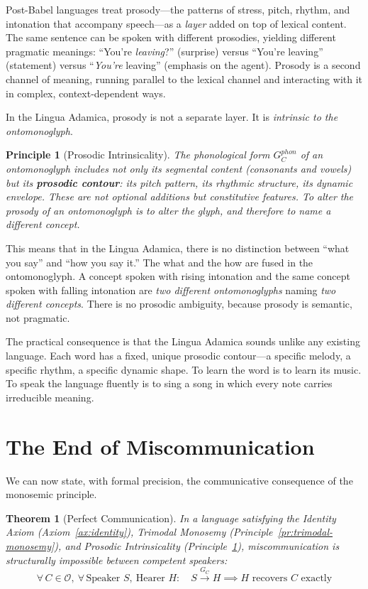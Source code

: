 \documentclass[12pt, letterpaper]{book}
\newtheorem{theorem}{Theorem}[chapter]
\newtheorem{principle}{Principle}[chapter]
\begin{document}
Post-Babel languages treat prosody---the patterns of stress, pitch, rhythm, and intonation that accompany speech---as a \textit{layer} added on top of lexical content. The same sentence can be spoken with different prosodies, yielding different pragmatic meanings: ``You're \textit{leaving}?'' (surprise) versus ``You're leaving'' (statement) versus ``\textit{You're} leaving'' (emphasis on the agent). Prosody is a second channel of meaning, running parallel to the lexical channel and interacting with it in complex, context-dependent ways.

In the Lingua Adamica, prosody is not a separate layer. It is \textit{intrinsic to the ontomonoglyph}.

\begin{principle}[Prosodic Intrinsicality]\label{pr:prosody}
The phonological form $G_C^{phon}$ of an ontomonoglyph includes not only its segmental content (consonants and vowels) but its \textbf{prosodic contour}: its pitch pattern, its rhythmic structure, its dynamic envelope. These are not optional additions but constitutive features. To alter the prosody of an ontomonoglyph is to alter the glyph, and therefore to name a different concept.
\end{principle}

This means that in the Lingua Adamica, there is no distinction between ``what you say'' and ``how you say it.'' The what and the how are fused in the ontomonoglyph. A concept spoken with rising intonation and the same concept spoken with falling intonation are \textit{two different ontomonoglyphs} naming \textit{two different concepts}. There is no prosodic ambiguity, because prosody is semantic, not pragmatic.

The practical consequence is that the Lingua Adamica sounds unlike any existing language. Each word has a fixed, unique prosodic contour---a specific melody, a specific rhythm, a specific dynamic shape. To learn the word is to learn its music. To speak the language fluently is to sing a song in which every note carries irreducible meaning.


\section{The End of Miscommunication}

We can now state, with formal precision, the communicative consequence of the monosemic principle.

\begin{theorem}[Perfect Communication]\label{thm:communication}
In a language satisfying the Identity Axiom (Axiom~\ref{ax:identity}), Trimodal Monosemy (Principle~\ref{pr:trimodal-monosemy}), and Prosodic Intrinsicality (Principle~\ref{pr:prosody}), miscommunication is structurally impossible between competent speakers:
\[
\forall\, C \in \mathcal{O},\ \forall\, \text{Speaker } S,\ \text{Hearer } H: \quad S \xrightarrow{G_C} H \implies H \text{ recovers } C \text{ exactly}
\]
\end{theorem}
\end{document}
